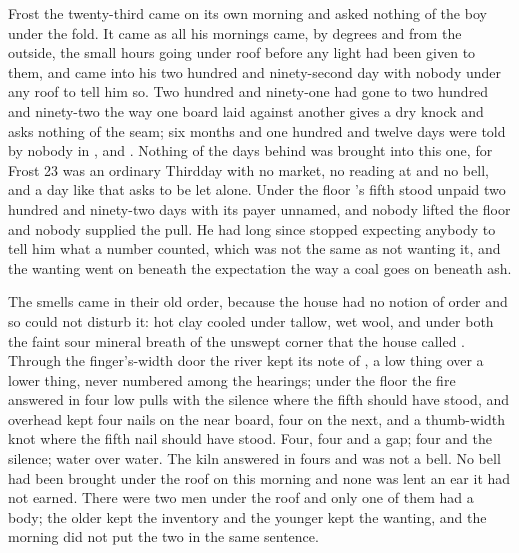 
Frost the twenty-third came on its own morning and asked nothing of the boy under the fold. It came as all his mornings came, by degrees and from the outside, the small hours going under  roof before any light had been given to them, and  came into his two hundred and ninety-second day with nobody under any roof to tell him so. Two hundred and ninety-one had gone to two hundred and ninety-two the way one board laid against another gives a dry knock and asks nothing of the seam; six months and one hundred and twelve days were told by nobody in ,  and . Nothing of the days behind was brought into this one, for Frost 23 was an ordinary Thirdday with no market, no reading at  and no bell, and a day like that asks to be let alone. Under the floor 's fifth stood unpaid two hundred and ninety-two days with its payer unnamed, and nobody lifted the floor and nobody supplied the pull. He had long since stopped expecting anybody to tell him what a number counted, which was not the same as not wanting it, and the wanting went on beneath the expectation the way a coal goes on beneath ash.

The smells came in their old order, because the house had no notion of order and so could not disturb it: hot clay cooled under tallow, wet wool, and under both the faint sour mineral breath of the unswept corner that the house called . Through the finger's-width door the river kept its note of , a low thing over a lower thing, never numbered among the hearings; under the floor the fire answered in four low pulls with the silence where the fifth should have stood, and overhead  kept four nails on the near board, four on the next, and a thumb-width knot where the fifth nail should have stood. Four, four and a gap; four and the silence; water over water. The kiln answered in fours and was not a bell. No bell had been brought under the roof on this morning and none was lent an ear it had not earned. There were two men under the roof and only one of them had a body; the older kept the inventory and the younger kept the wanting, and the morning did not put the two in the same sentence.

\scenebreak

